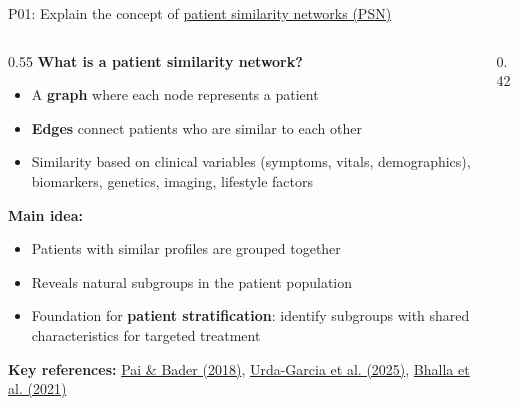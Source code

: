 \documentclass[aspectratio=169, 10pt]{beamer}
\begin{document}
\begin{frame}{P01: Explain the concept of \href{https://en.wikipedia.org/wiki/Patient_similarity_network}{patient similarity networks (PSN)}}
    \begin{columns}[T]
        \begin{column}{0.55\textwidth}
            \textbf{What is a patient similarity network?}
            \begin{itemize}
                \item A \textbf{graph} where each node represents a patient
                \item \textbf{Edges} connect patients who are similar to each other
                \item Similarity based on clinical variables (symptoms, vitals, demographics), biomarkers, genetics, imaging, lifestyle factors
            \end{itemize}
            
            \vspace{0.2cm}
            \textbf{Main idea:}
            \begin{itemize}
                \item Patients with similar profiles are grouped together
                \item Reveals natural subgroups in the patient population
                \item Foundation for \textbf{patient stratification}: identify subgroups with shared characteristics for targeted treatment
            \end{itemize}
            
            \vspace{0.2cm}
            \scriptsize\textbf{Key references:}
            \href{https://doi.org/10.1038/ncomms5022}{Pai \& Bader (2018)},
            \href{https://doi.org/10.1073/pnas.2421060122}{Urda-Garcia et al. (2025)},
            \href{https://www.science.org/doi/10.1126/sciadv.abg9551}{Bhalla et al. (2021)}
        \end{column}
        \begin{column}{0.42\textwidth}
\end{column}
\end{columns}
\end{frame}
\end{document}
